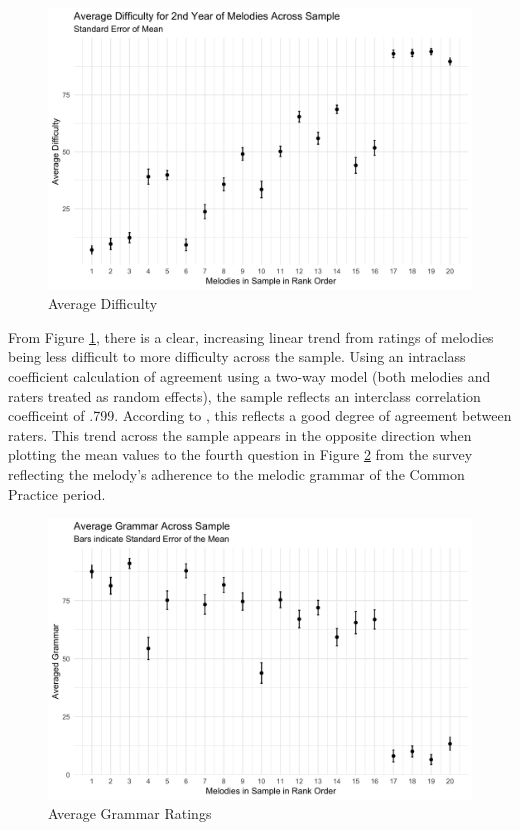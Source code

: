 \documentclass[]{book}
\begin{document}
\begin{figure}

{\centering \includegraphics[width=1\linewidth]{img/difficulty_plot} 

}

\caption{Average Difficulty}\label{fig:diffplot}
\end{figure}

From Figure \ref{fig:diffplot}, there is a clear, increasing linear trend from ratings of melodies being less difficult to more difficulty across the sample.
Using an intraclass coefficient calculation of agreement using a two-way model (both melodies and raters treated as random effects), the sample reflects an interclass correlation coefficeint of .799.
According to \citet{kooGuidelineSelectingReporting2016}, this reflects a good degree of agreement between raters.
This trend across the sample appears in the opposite direction when plotting the mean values to the fourth question in Figure \ref{fig:grammarplot} from the survey reflecting the melody's adherence to the melodic grammar of the Common Practice period.

\begin{figure}

{\centering \includegraphics[width=0.8\linewidth]{img/grammar_plot} 

}

\caption{Average Grammar Ratings}\label{fig:grammarplot}
\end{figure}
\end{document}
